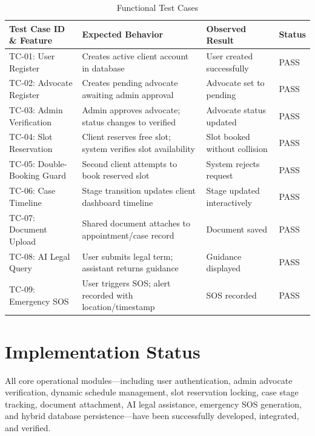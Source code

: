 \begin{table}[h!]
    \centering
    \caption{Functional Test Cases}
    \label{tab:test_cases}
    \small
    \begin{tabular}{p{3.5cm} p{5.5cm} p{2.5cm} p{1.8cm}}
        \toprule
        \textbf{Test Case ID \& Feature} & \textbf{Expected Behavior} & \textbf{Observed Result} & \textbf{Status} \\
        \midrule
        TC-01: User Register & Creates active client account in database & User created successfully & PASS \\
        TC-02: Advocate Register & Creates pending advocate awaiting admin approval & Advocate set to pending & PASS \\
        TC-03: Admin Verification & Admin approves advocate; status changes to verified & Advocate status updated & PASS \\
        TC-04: Slot Reservation & Client reserves free slot; system verifies slot availability & Slot booked without collision & PASS \\
        TC-05: Double-Booking Guard & Second client attempts to book reserved slot & System rejects request & PASS \\
        TC-06: Case Timeline & Stage transition updates client dashboard timeline & Stage updated interactively & PASS \\
        TC-07: Document Upload & Shared document attaches to appointment/case record & Document saved & PASS \\
        TC-08: AI Legal Query & User submits legal term; assistant returns guidance & Guidance displayed & PASS \\
        TC-09: Emergency SOS & User triggers SOS; alert recorded with location/timestamp & SOS recorded & PASS \\
        \bottomrule
    \end{tabular}
\end{table}

\section{Implementation Status}
All core operational modules—including user authentication, admin advocate verification, dynamic schedule management, slot reservation locking, case stage tracking, document attachment, AI legal assistance, emergency SOS generation, and hybrid database persistence—have been successfully developed, integrated, and verified.

\clearpage
